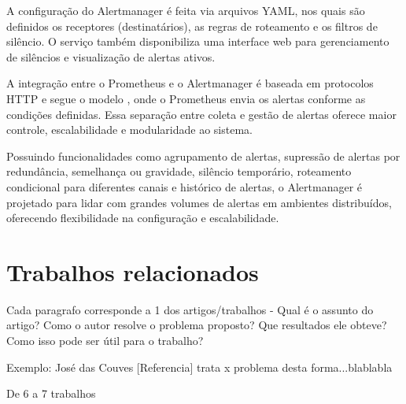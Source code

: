A configuração do Alertmanager é feita via arquivos YAML, nos quais são definidos os receptores (destinatários), as regras de roteamento e os filtros de silêncio. O serviço também disponibiliza uma interface web para gerenciamento de silêncios e visualização de alertas ativos.

A integração entre o Prometheus e o Alertmanager é baseada em protocolos HTTP e segue o modelo , onde o Prometheus envia os alertas conforme as condições definidas. Essa separação entre coleta e gestão de alertas oferece maior controle, escalabilidade e modularidade ao sistema.

Possuindo funcionalidades como agrupamento de alertas, supressão de alertas por redundância, semelhança ou gravidade, silêncio temporário, roteamento condicional para diferentes canais e histórico de alertas, o Alertmanager  é projetado para lidar com grandes volumes de alertas em ambientes distribuídos, oferecendo flexibilidade na configuração e escalabilidade.

\section{Trabalhos relacionados}
\label{section:TrabalhosRelacionados}

Cada paragrafo corresponde a 1 dos artigos/trabalhos - Qual é o assunto do artigo? Como o autor resolve o problema proposto? Que resultados ele obteve? Como isso pode ser útil para o trabalho?

Exemplo: José das Couves [Referencia] trata x problema desta forma...blablabla

De 6 a 7 trabalhos